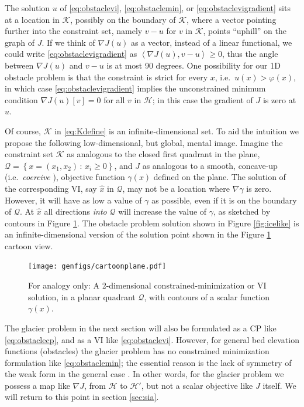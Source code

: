 \documentclass[letterpaper,final,12pt,reqno]{amsart}
\theoremstyle{claim}
\newcommand{\grad}{\nabla}
\newcommand{\ip}[2]{\left<#1,#2\right>}
\numberwithin{equation}{section}
\numberwithin{figure}{section}
\numberwithin{table}{section}
\begin{document}
The solution $u$ of \eqref{eq:obstaclevi}, \eqref{eq:obstaclemin}, or \eqref{eq:obstaclevigradient} sits at a location in $\mathcal{K}$, possibly on the boundary of $\mathcal{K}$, where a vector pointing further into the constraint set, namely $v-u$ for $v$ in $\mathcal{K}$, points ``uphill'' on the graph of $J$.  If we think of $\nabla J(u)$ as a vector, instead of a linear functional, we could write \eqref{eq:obstaclevigradient} as $\ip{\nabla J(u)}{v-u} \ge 0$, thus the angle between $\nabla J(u)$ and $v-u$ is at most 90 degrees.  One possibility for our 1D obstacle problem is that the constraint is strict for every $x$, i.e.~$u(x) > \varphi(x)$, in which case \eqref{eq:obstaclevigradient} implies the unconstrained minimum condition $\nabla J(u)[v] = 0$ for all $v$ in $\mathcal{H}$; in this case the gradient of $J$ is zero at $u$.

Of course, $\mathcal{K}$ in \eqref{eq:Kdefine} is an infinite-dimensional set.  To aid the intuition we propose the following low-dimensional, but global, mental image.  Imagine the constraint set $\mathcal{K}$ as analogous to the closed first quadrant in the plane, $\mathcal{Q} = \left\{x = (x_1,x_2)\,:\,x_i\ge 0\right\}$, and $J$ as analogous to a smooth, concave-up (i.e.~\emph{coercive} \cite{Evans2010}), objective function $\gamma(x)$ defined on the plane.  The solution of the corresponding VI, say $\hat x$ in $\mathcal{Q}$, may not be a location where $\nabla \gamma$ is zero.  However, it will have as low a value of $\gamma$ as possible, even if it is on the boundary of $\mathcal{Q}$.  At $\hat x$ all directions \emph{into} $\mathcal{Q}$ will increase the value of $\gamma$, as sketched by contours in Figure \ref{fig:cartoonplane}.  The obstacle problem solution shown in Figure \ref{fig:icelike} is an infinite-dimensional version of the solution point shown in the Figure \ref{fig:cartoonplane} cartoon view.

\begin{figure}
\texttt{[image: genfigs/cartoonplane.pdf]}
\caption{For analogy only:  A 2-dimensional constrained-minimization or VI solution, in a planar quadrant $\mathcal{Q}$, with contours of a scalar function $\gamma(x)$.}
\label{fig:cartoonplane}
\end{figure}

The glacier problem in the next section will also be formulated as a CP like \eqref{eq:obstaclecp}, and as a VI like \eqref{eq:obstaclevi}.  However, for general bed elevation functions (obstacles) the glacier problem has no constrained minimization formulation like \eqref{eq:obstaclemin}; the essential reason is the lack of symmetry of the weak form in the general case \cite{JouvetBueler2012}.  In other words, for the glacier problem we possess a map like $\grad J$, from $\mathcal{H}$ to $\mathcal{H}'$, but not a scalar objective like $J$ itself.  We will return to this point in section \ref{sec:sia}.
\end{document}
